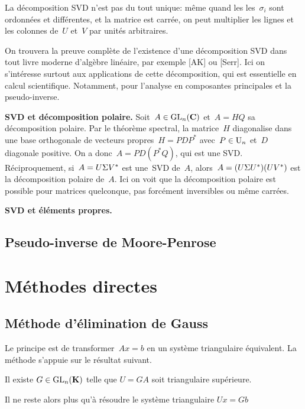 \begin{remark}
	La décomposition SVD n'est pas du tout unique: même quand les
	les~$\sigma_i$ sont ordonnées et différentes, et la matrice est carrée, on
	peut multiplier les lignes et les colonnes de~$U$ et~$V$ par unités
	arbitraires.
\end{remark}

On trouvera la preuve complète de l'existence d'une décomposition SVD dans
tout livre moderne d'algèbre linéaire, par exemple [AK] ou [Serr].  Ici on
s'intéresse surtout aux applications de cette décomposition, qui est
essentielle en calcul scientifique.  Notamment, pour l'analyse en composantes
principales et la pseudo-inverse.

{\bf SVD et décomposition polaire.}
Soit~$A\in\mathrm{GL}_n(\mathbf{C})$ et~$A=HQ$ sa décomposition polaire.  Par le théorème
spectral, la matrice~$H$ diagonalise dans une base orthogonale de vecteurs
propres~$H=PDP^*$ avec~$P\in\mathrm{U}_n$ et~$D$ diagonale positive.  On a
donc~$A=PD(P^*Q)$, qui est une SVD.
Réciproquement, si~$A=U\/\Sigma V^*$ est une~SVD de~$A$,
alors~$A=(U\/\Sigma U^*)(UV^*)$ est la décomposition polaire de~$A$.  Ici on
voit que la décomposition polaire est possible pour matrices quelconque, pas
forcément inversibles ou même carrées.

{\bf SVD et éléments propres.}


\subsection{Pseudo-inverse de Moore-Penrose}

\section{Méthodes directes}


\subsection{Méthode d'élimination de Gauss}

Le principe est de transformer~$Ax=b$ en un système
triangulaire équivalent. La méthode s'appuie sur le résultat suivant.

\begin{proposition}
Il existe $G \in\mathrm{GL}_n(\mathbf{K})$ telle que $U = GA$ soit triangulaire supérieure.
\end{proposition}
Il ne reste alors plus qu'à résoudre le système triangulaire $Ux = Gb$

